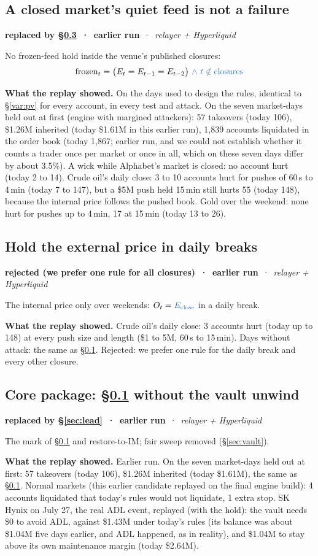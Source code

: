 \documentclass[10.5pt,a4paper]{article}
\newcommand{\chg}[1]{\ensuremath{{\color[HTML]{2F74D0}#1}}}
\newcommand{\rem}[1]{\textcolor{rem}{\ensuremath{#1}}}
\newcommand{\st}[3]{\textcolor{#1}{\textbf{#2}} \,·\, \emph{#3}\par}
\newcommand{\res}[1]{\par\textbf{What the replay showed.} #1\par}
\begin{document}
\subsection{A closed market's quiet feed is not a failure}\label{var:pk}
\st{sup}{replaced by \S\ref{var:core} \,·\, earlier run}{relayer + Hyperliquid}
No frozen-feed hold inside the venue's published closures:
\begin{equation}
\text{frozen}_t = \big(E_t = E_{t-1} = E_{t-2}\big)\ \chg{\wedge\ t \notin \text{closures}}
\end{equation}
\res{On the days used to design the rules, identical to \S\ref{var:pv} for every account, in every test and attack. On the seven market-days held out at first (engine with margined attackers): 57 takeovers (today 106), \$1.26M inherited (today \$1.61M in this earlier run), 1{,}839 accounts liquidated in the order book (today 1{,}867; earlier run, and we could not establish whether it counts a trader once per market or once in all, which on these seven days differ by about 3.5\%). A wick while Alphabet's market is closed: no account hurt (today 2 to 14). Crude oil's daily close: 3 to 10 accounts hurt for pushes of 60\,s to 4\,min (today 7 to 147), but a \$5M push held 15\,min still hurts 55 (today 148), because the internal price follows the pushed book. Gold over the weekend: none hurt for pushes up to 4\,min, 17 at 15\,min (today 13 to 26).}

\subsection{Hold the external price in daily breaks}\label{var:pb}
\st{rej}{rejected (we prefer one rule for all closures) \,·\, earlier run}{relayer + Hyperliquid}
The internal price only over weekends: $O_t = \chg{E_{\text{close}}}$ in a daily break.
\res{Crude oil's daily close: 3 accounts hurt (today up to 148) at every push size and length (\$1 to 5M, 60\,s to 15\,min). Days without attack: the same as \S\ref{var:pk}. Rejected: we prefer one rule for the daily break and every other closure.}

\subsection{Core package: \S\ref{var:pk} without the vault unwind}\label{var:core}
\st{sup}{replaced by \S\ref{sec:lead} \,·\, earlier run}{relayer + Hyperliquid}
The mark of \S\ref{var:pk} and restore-to-IM; \rem{\text{fair sweep}} removed (\S\ref{sec:vault}).
\res{Earlier run. On the seven market-days held out at first: 57 takeovers (today 106), \$1.26M inherited (today \$1.61M), the same as \S\ref{var:pk}. Normal markets (this earlier candidate replayed on the final engine build): 4 accounts liquidated that today's rules would not liquidate, 1 extra stop. SK Hynix on July 27, the real ADL event, replayed (with the hold): the vault needs \$0 to avoid ADL, against \$1.43M under today's rules (its balance was about \$1.04M five days earlier, and ADL happened, as in reality), and \$1.04M to stay above its own maintenance margin (today \$2.64M).}
\end{document}
